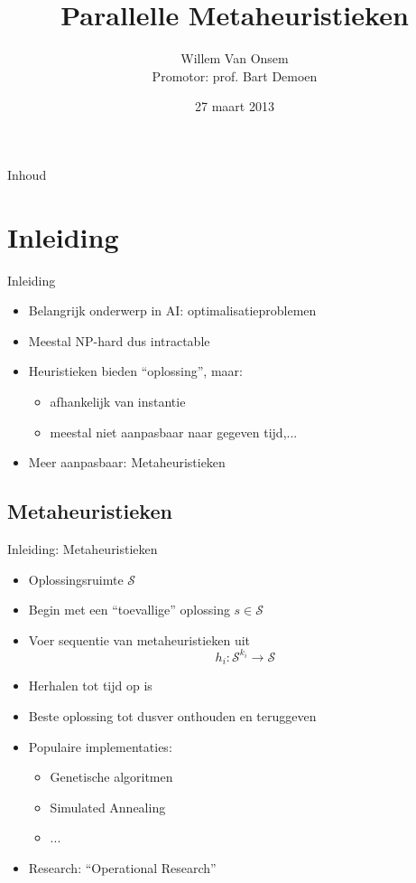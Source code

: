 \documentclass{beamer}
\title{Parallelle Metaheuristieken}
\author{Willem Van Onsem\\Promotor: prof. Bart Demoen}
\date{27 maart 2013}
\newcommand{\sol}{\mathcal{S}}
\begin{document}
\begin{frame}[plain]
\maketitle
\end{frame}
\begin{frame}{Inhoud}
\tableofcontents
\end{frame}
\section{Inleiding}
\begin{frame}{Inleiding}
\begin{itemize}[<+->]
 \item Belangrijk onderwerp in AI: optimalisatieproblemen
 \item Meestal NP-hard dus intractable
 \item Heuristieken bieden ``oplossing'', maar:
 \begin{itemize}[<+->]
  \item afhankelijk van instantie
  \item meestal niet aanpasbaar naar gegeven tijd,...
 \end{itemize}
 \item Meer aanpasbaar: Metaheuristieken
\end{itemize}
\end{frame}
\subsection{Metaheuristieken}
\begin{frame}{Inleiding: Metaheuristieken}
\begin{itemize}[<+->]
 \item Oplossingsruimte $\sol$
 \item Begin met een ``toevallige'' oplossing $s\in\sol$
 \item Voer sequentie van metaheuristieken uit
 \begin{equation}
  h_i:\sol^{k_i}\rightarrow\sol
 \end{equation}
 \item Herhalen tot tijd op is
 \item Beste oplossing tot dusver onthouden en teruggeven
 \item Populaire implementaties:
 \begin{itemize}[<+->]
   \item Genetische algoritmen
   \item Simulated Annealing
   \item ...
 \end{itemize}
 \item Research: ``Operational Research''
\end{itemize}
\end{frame}
\end{document}
